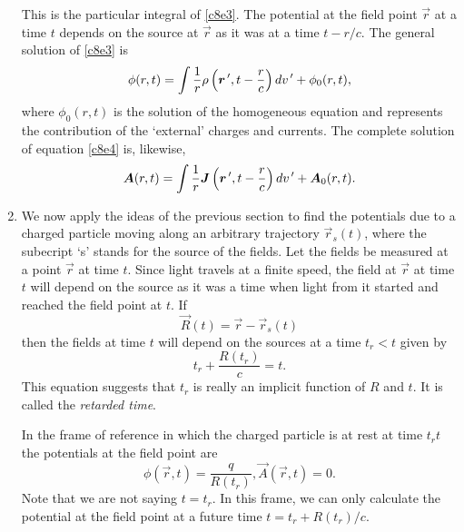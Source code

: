 \begin{enumerate}
This is the particular integral of \eqref{c8e3}. The potential at the field 
point $\vec{r}$ at a time $t$ depends on the source at $\vec{r}$ as it was at 
a time $t - r/c$. The general solution of \eqref{c8e3} is
\begin{equation}\label{c8e13}
\phi(r, t) = \int\frac{1}{r}\rho\left(\bm{r}^{\,\prime}, t - \frac{r}{c}\right)dv^{\,\prime}
 + \phi_0(r, t),
\end{equation}
where $\phi_0(r, t)$ is the solution of the homogeneous equation and represents
the contribution of the `external' charges and currents. The complete solution 
of equation \eqref{c8e4} is, likewise,
\begin{equation}\label{c8e14}
\bm{A}(r, t) = 
\int\frac{1}{r}\bm{J}\left(\bm{r}^{\,\prime}, t - \frac{r}{c}\right)dv^{\,\prime}
 + \bm{A}_0(r, t).
\end{equation}

\item We now apply the ideas of the previous section to find the potentials
due to a charged particle moving along an arbitrary trajectory $\vec{r}_s(t)$,
where the subecript `s' stands for the source of the fields. Let the fields be
measured at a point $\vec{r}$ at time $t$. Since light travels at a finite 
speed, the field at $\vec{r}$ at time $t$ will depend on the source as it was
a time when light from it started and reached the field point at $t$. If 
\begin{equation}\label{c8e15}
\vec{R}(t) = \vec{r} - \vec{r}_s(t)
\end{equation}
then the fields at time $t$ will depend on the sources at a time $t_r < t$ 
given by
\begin{equation}\label{c8e16}
t_r + \frac{R(t_r)}{c} = t.
\end{equation}
This equation suggests that $t_r$ is really an implicit function of $R$ and $t$.
It is called the \emph{retarded time}.

In the frame of reference in which the charged particle is at rest at time
$t_rt$ the potentials at the field point are
\begin{equation}\label{c8e17}
\phi(\vec{r}, t) = \frac{q}{R(t_r)}, \vec{A}(\vec{r}, t) = 0.
\end{equation}
Note that we are not saying $t = t_r$. In this frame, we can only calculate the
potential at the field point at a future time $t = t_r + R(t_r)/c$.


\end{enumerate}
